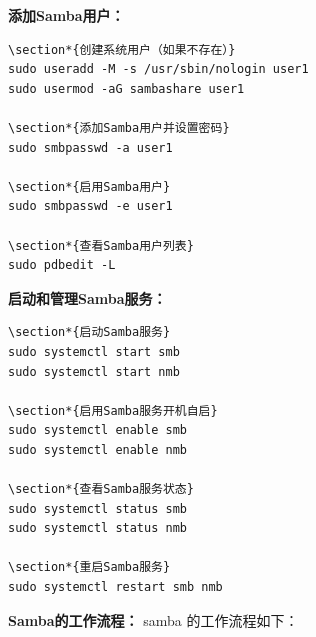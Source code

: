 \documentclass[12pt,UTF8]{ctexbook}
\begin{document}
\textbf{添加Samba用户：}
\begin{verbatim}
\section*{创建系统用户（如果不存在）}
sudo useradd -M -s /usr/sbin/nologin user1
sudo usermod -aG sambashare user1

\section*{添加Samba用户并设置密码}
sudo smbpasswd -a user1

\section*{启用Samba用户}
sudo smbpasswd -e user1

\section*{查看Samba用户列表}
sudo pdbedit -L
\end{verbatim}

\textbf{启动和管理Samba服务：}
\begin{verbatim}
\section*{启动Samba服务}
sudo systemctl start smb
sudo systemctl start nmb

\section*{启用Samba服务开机自启}
sudo systemctl enable smb
sudo systemctl enable nmb

\section*{查看Samba服务状态}
sudo systemctl status smb
sudo systemctl status nmb

\section*{重启Samba服务}
sudo systemctl restart smb nmb
\end{verbatim}

\textbf{Samba的工作流程：}
samba 的工作流程如下：
\end{document}
